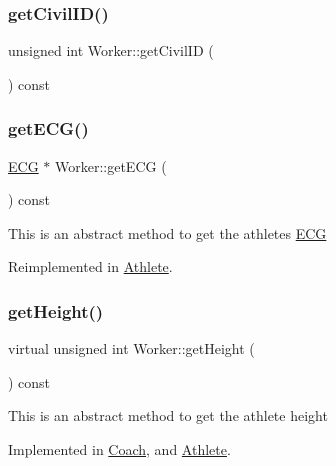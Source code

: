\subsubsection{\texorpdfstring{get\+Civil\+I\+D()}{getCivilID()}}
{\footnotesize\ttfamily unsigned int Worker\+::get\+Civil\+ID (\begin{DoxyParamCaption}{ }\end{DoxyParamCaption}) const}

\hypertarget{class_worker_a625cb5da072fd244f38f42e15693058a}{}\label{class_worker_a625cb5da072fd244f38f42e15693058a} 
\subsubsection{\texorpdfstring{get\+E\+C\+G()}{getECG()}}
{\footnotesize\ttfamily \hyperlink{class_e_c_g}{E\+CG} $\ast$ Worker\+::get\+E\+CG (\begin{DoxyParamCaption}{ }\end{DoxyParamCaption}) const\hspace{0.3cm}{\ttfamily [virtual]}}

This is an abstract method to get the athlete\textquotesingle{}s \hyperlink{class_e_c_g}{E\+CG} 

Reimplemented in \hyperlink{class_athlete_a9655c13ed4126435df2e57e64884deab}{Athlete}.

\hypertarget{class_worker_a1c5dcdc1c7dc5e498a44f678e964bbfd}{}\label{class_worker_a1c5dcdc1c7dc5e498a44f678e964bbfd} 
\subsubsection{\texorpdfstring{get\+Height()}{getHeight()}}
{\footnotesize\ttfamily virtual unsigned int Worker\+::get\+Height (\begin{DoxyParamCaption}{ }\end{DoxyParamCaption}) const\hspace{0.3cm}{\ttfamily [pure virtual]}}

This is an abstract method to get the athlete height 

Implemented in \hyperlink{class_coach_af899da3e98bc326b9abdf3ef46cf5279}{Coach}, and \hyperlink{class_athlete_a54a75ed3943dc6b5e229997be8422466}{Athlete}.

\hypertarget{class_worker_a8b3e221c4a1ebd12ade03ee9b9c86182}{}\label{class_worker_a8b3e221c4a1ebd12ade03ee9b9c86182} 
